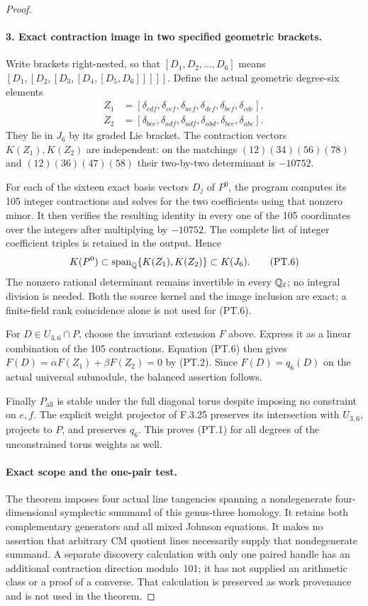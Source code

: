 \begin{proof}
\paragraph{3. Exact contraction image in two specified geometric brackets.}
Write brackets right-nested, so that
$[D_1,D_2,\ldots,D_6]$ means
$[D_1,[D_2,[D_3,[D_4,[D_5,D_6]]]]]$.
Define the actual geometric degree-six elements
\[
\begin{split}
 Z_1&=[\delta_{cdf},\delta_{cef},\delta_{aef},
          \delta_{def},\delta_{bef},\delta_{cde}],\\
 Z_2&=[\delta_{bce},\delta_{adf},\delta_{adf},
          \delta_{abd},\delta_{bce},\delta_{abc}].
\end{split}                                               \tag{PT.5}
\]
They lie in $J_6$ by its graded Lie bracket.
The contraction vectors $K(Z_1),K(Z_2)$ are
independent: on the matchings
$(12)(34)(56)(78)$ and $(12)(36)(47)(58)$
their two-by-two determinant is $-10752$.

For each of the sixteen exact basis vectors
$D_j$ of $P^0$, the program computes its
105 integer contractions and solves for the
two coefficients using that nonzero minor.
It then verifies the resulting identity in
every one of the 105 coordinates over the
integers after multiplying by $-10752$.
The complete list of integer coefficient
triples is retained in the output. Hence
\[
       K(P^0)\subset\operatorname{span}_{\mathbb Q}
                         \{K(Z_1),K(Z_2)\}\subset K(J_6).
                                                               \tag{PT.6}
\]
The nonzero rational determinant remains invertible
in every $\mathbb Q_\ell$; no integral division is needed.
Both the source kernel and the image inclusion
are exact; a finite-field rank coincidence
alone is not used for (PT.6).

For $D\in U_{3,6}\cap P$, choose the invariant
extension $F$ above. Express it as a linear
combination of the 105 contractions. Equation
(PT.6) then gives
$F(D)=\alpha F(Z_1)+\beta F(Z_2)=0$
by (PT.2). Since $F(D)=q_6(D)$ on the actual
universal submodule, the balanced assertion follows.

Finally $P_{\mathrm{all}}$ is stable under the
full diagonal torus despite imposing no
constraint on $e,f$. The explicit weight
projector of F.3.25 preserves its intersection
with $U_{3,6}$, projects to $P$, and preserves
$q_6$. This proves (PT.1) for all degrees of
the unconstrained torus weights as well.

\paragraph{Exact scope and the one-pair test.}
The theorem imposes four actual line tangencies
spanning a nondegenerate four-dimensional
symplectic summand of this genus-three homology.
It retains both complementary generators and
all mixed Johnson equations. It makes no
assertion that arbitrary CM quotient lines
necessarily supply that nondegenerate summand.
A separate discovery calculation with only
one paired handle has an additional contraction
direction modulo~101; it has not supplied an
arithmetic class or a proof of a converse.
That calculation is preserved as work provenance
and is not used in the theorem.


\end{proof}
